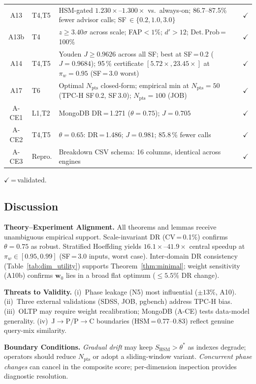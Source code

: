 \documentclass[10pt,twocolumn,a4paper]{article}
\newcommand{\SHSM}{S_{\mathrm{HSM}}}
\newcommand{\Npts}{N_{\mathrm{pts}}}
\newcommand{\thetastar}{\theta^{*}}
\begin{document}
\begin{table}[!htb]
\begin{tabular}{@{}clp{4.8cm}c@{}}
A13 & T4,T5 & HSM-gated $1.230\times$--$1.300\times$ vs.\ always-on; 86.7--87.5\% fewer advisor calls; SF\,$\in\{0.2,1.0,3.0\}$ & $\checkmark$\\
A13b & T4 & $z\!\ge\!3.40\sigma$ across scale; FAP$\!<\!1$\%; $d'\!>\!12$; Det.\,Prob\,=\,100\% & $\checkmark$\\
A14 & T4,T5 & Youden $J\!\ge\!0.9626$ across all SF; best at SF\,=\,0.2 ($J\!=\!0.9684$); 95\,\% certificate $[5.72\!\times\!,23.45\!\times]$ at $\pi_w\!=\!0.95$ (SF\,=\,3.0 worst) & $\checkmark$\\
A17 & T6   & Optimal $\Npts$ closed-form; empirical min at $\Npts\!=\!50$ (TPC-H SF\,0.2, SF\,3.0); $\Npts\!=\!100$ (JOB) & $\checkmark$\\
\midrule
A-CE1 & L1,T2 & MongoDB DR\,=\,1.271 ($\theta\!=\!0.75$); $J\!=\!0.705$ & $\checkmark$\\
A-CE2 & T4,T5 & $\theta\!=\!0.65$: DR\,=\,1.486; $J\!=\!0.981$; 85.8\,\% fewer calls  & $\checkmark$\\
A-CE3 & Repro.& Breakdown CSV schema: 16 columns, identical across engines & $\checkmark$\\
\bottomrule
\end{tabular}
\par\smallskip $\checkmark$\,=\,validated.
\end{table}

\FloatBarrier
\subsection{Discussion}

\textbf{Theory--Experiment Alignment.}
All theorems and lemmas receive unambiguous empirical support.
Scale-invariant DR (CV\,=\,0.1\%) confirms $\theta\!=\!0.75$ as robust.
Stratified Hoeffding yields $16.1\times$--$41.9\times$ central speedup at
$\pi_w\!\in\![0.95,0.99]$ (SF\,=\,3.0 inputs, worst case).
Inter-domain DR consistency (Table~\ref{tab:dim_utility})
supports Theorem~\ref{thm:minimal}; weight sensitivity (A10b) confirms
$\mathbf{w}_0$ lies in a broad flat optimum ($\leq5.5\%$ DR change).

\textbf{Threats to Validity.}
(i)~Phase leakage (N5) most influential ($\pm13$\%, A10).
(ii)~Three external validations (SDSS, JOB, pgbench) address TPC-H bias.
(iii)~OLTP may require weight recalibration; MongoDB (A-CE) tests data-model generality.
(iv)~J$\to$P/P$\to$C boundaries (HSM\,=\,0.77--0.83) reflect genuine query-mix similarity.

\textbf{Boundary Conditions.}
\textit{Gradual drift} may keep $\SHSM\!>\!\thetastar$ as indexes degrade;
operators should reduce $\Npts$ or adopt a sliding-window variant.
\textit{Concurrent phase changes} can cancel in the composite score;
per-dimension inspection provides diagnostic resolution.
\end{document}

